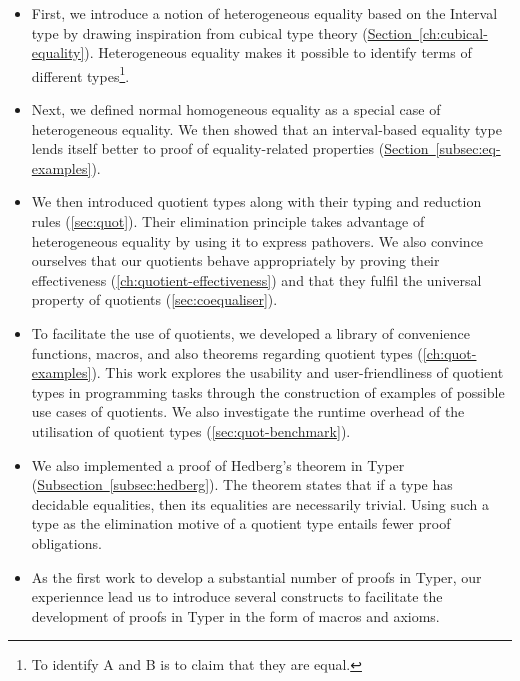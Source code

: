 \documentclass[12pt,twoside,maitrise]{dms}
\theoremstyle{definition}
\numberwithin{equation}{section}
\numberwithin{table}{chapter}
\numberwithin{figure}{chapter}
\begin{document}
\begin{itemize}
  \item{First, we introduce a notion of heterogeneous equality based on the
    Interval type by drawing inspiration from cubical type theory
    (\hyperref[ch:cubical-equality]{Section~\ref*{ch:cubical-equality}}).
    Heterogeneous equality makes it possible to identify terms of different
    types\footnote{To identify A and B is to claim that they are equal.}. }

  \item{Next, we defined normal homogeneous equality as a special case of
    heterogeneous equality. We then showed that an interval-based equality
    type lends itself better to proof of equality-related properties
    (\hyperref[subsec:eq-examples]{Section~\ref*{subsec:eq-examples}}).}

  \item{We then introduced quotient types along with their typing and reduction
    rules (\autoref{sec:quot}). Their elimination principle takes advantage of
    heterogeneous equality by using it to express
    pathovers\cite{licata2015cubical}. We also convince ourselves that our
    quotients behave appropriately by proving their effectiveness
    (\autoref{ch:quotient-effectiveness}) and that they fulfil the universal
    property of quotients (\autoref{sec:coequaliser}). }

  \item{To facilitate the use of quotients, we developed a library of
    convenience functions, macros, and also theorems regarding quotient types
    (\autoref{ch:quot-examples}). This work explores the usability and
    user-friendliness of quotient types in programming tasks through the
    construction of examples of possible use cases of quotients. We also
    investigate the runtime overhead of the utilisation of quotient types
    (\autoref{sec:quot-benchmark}).}

  \item{We also implemented a proof of Hedberg's
    theorem\cite{hedberg1998coherence} in Typer
    (\hyperref[subsec:hedberg]{Subsection~\ref*{subsec:hedberg}}). The theorem
    states that if a type has decidable equalities, then its equalities are
    necessarily trivial. Using such a type as the elimination motive of a
    quotient type entails fewer proof obligations. }

  \item{As the first work to develop a substantial number of proofs in Typer,
    our experiennce lead us to introduce several constructs to facilitate the
    development of proofs in Typer in the form of macros and axioms. }
\end{itemize}
\end{document}

